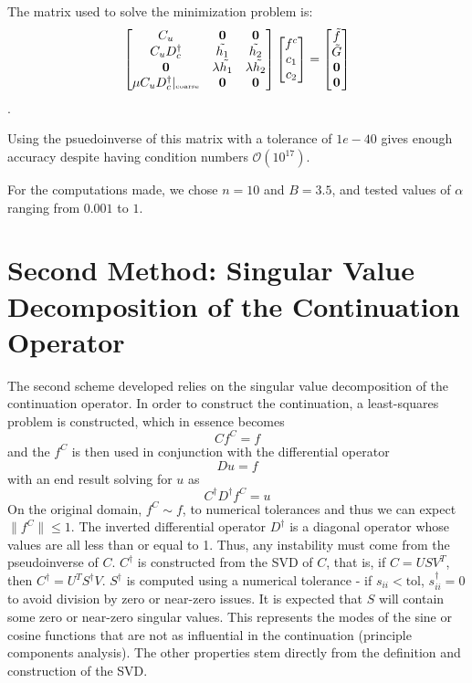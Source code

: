 \documentclass[11pt]{amsart}
\begin{document}
The matrix used to solve the minimization problem is:
\begin{equation}
\begin{bmatrix}
C_u & \mathbf{0} & \mathbf{0}\\
C_u D_c^{\dagger} & \tilde{h_1} & \tilde{h_2} \\
\mathbf{0} & \lambda \tilde{h_1} & \lambda \tilde{h_2} \\
\mu C_u D_c^{\dagger}|_{\text{\tiny{coarse}}} & \mathbf{0} & \mathbf{0}
\end{bmatrix}
\begin{bmatrix}
f^c \\
c_1\\
c_2
\end{bmatrix}
= 
\begin{bmatrix}
\tilde{f} \\
\tilde{G}\\
\mathbf{0}\\
\mathbf{0}
\end{bmatrix}
\end{equation}.  

Using the psuedoinverse of this matrix with a tolerance of $1e-40$ gives enough accuracy despite having condition numbers $\mathcal{O}(10^{17})$.  

For the computations made, we chose $n=10$ and $B=3.5$, and tested values of $\alpha$ ranging from $0.001$ to $1$.  




\section{Second Method: Singular Value Decomposition of the Continuation Operator}
The second scheme developed relies on the singular value decomposition of the continuation operator. In order to construct the continuation, a least-squares problem is constructed, which in essence becomes 
\begin{equation}
C f^C=f
\end{equation}
and the $f^C$ is then used in conjunction with the differential operator 
\begin{equation}
Du=f
\end{equation}
with an end result solving for $u$ as
\begin{equation}
C^{\dag}D^{\dag}f^C=u
\end{equation}
On the original domain, $f^C \sim f$, to numerical tolerances and thus we can expect $\|f^C\| \leq 1$.  The inverted differential operator $D^{\dag}$ is a diagonal operator whose values are all less than or equal to 1.  Thus, any instability must come from the pseudoinverse of $C$.  
$C^{\dag}$ is constructed from the SVD of $C$, that is, if $C=USV^{T}$, then $C^{\dag}=U^{T}S^{\dag}V$.  $S^{\dag}$ is computed using a numerical tolerance - if $s_{ii}<\text{tol}$, $s^{\dag}_{ii}=0$ to avoid division by zero or near-zero issues. It is expected that $S$ will contain some zero or near-zero singular values. This represents the modes of the sine or cosine functions that are not as influential in the continuation (principle components analysis).  The other properties stem directly from the definition and construction of the SVD.  
\end{document}
